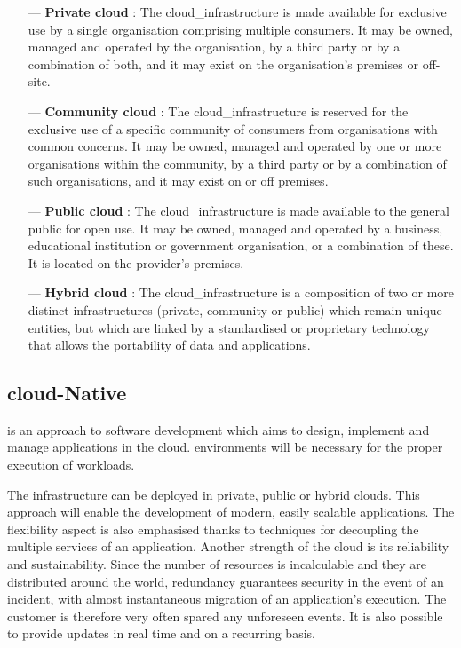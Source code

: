 \begin{itemize}
    \item[—] \textbf{Private \gls{cloud}} : The \gls{cloud_infrastructure} is made available for exclusive use by a single organisation comprising multiple consumers. It may be owned, managed and operated by the organisation, by a third party or by a combination of both, and it may exist on the organisation's premises or off-site.
    \item[—] \textbf{Community \gls{cloud}} : The \gls{cloud_infrastructure} is reserved for the exclusive use of a specific community of consumers from organisations with common concerns. It may be owned, managed and operated by one or more organisations within the community, by a third party or by a combination of such organisations, and it may exist on or off premises.
    \item[—] \textbf{Public \gls{cloud}} : The \gls{cloud_infrastructure} is made available to the general public for open use. It may be owned, managed and operated by a business, educational institution or government organisation, or a combination of these. It is located on the provider's premises.
    \item[—] \textbf{Hybrid \gls{cloud}} : The \gls{cloud_infrastructure} is a composition of two or more distinct infrastructures (private, community or public) which remain unique entities, but which are linked by a standardised or proprietary technology that allows the portability of data and applications.
\end{itemize}

\subsection{\Gls{cloud}-Native}
\label{subsec:cloudnative}
 is an approach to software development which aims to design, implement and manage applications in the \gls{cloud}.  environments will be necessary for the proper execution of workloads.

The infrastructure can be deployed in private, public or hybrid \glspl{cloud}. This approach will enable the development of modern, easily scalable applications. The flexibility aspect is also emphasised thanks to techniques for decoupling the multiple services of an application. Another strength of the \gls{cloud} is its reliability and sustainability. Since the number of resources is incalculable and they are distributed around the world, redundancy guarantees security in the event of an incident, with almost instantaneous migration of an application's execution. The customer is therefore very often spared any unforeseen events. It is also possible to provide updates in real time and on a recurring basis.

